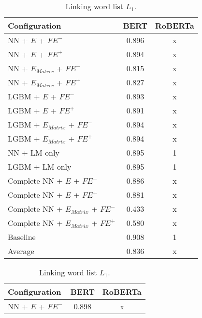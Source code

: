 \begin{table}[h]
  	\tiny
  	\centering
	\begin{subtable}{.5\textwidth}
		\centering
  		\renewcommand{\arraystretch}{1.4}
   		\begin{tabular}{|| l || c | c ||}
   			\hline
   			{Configuration} & {BERT} & {RoBERTa} \\
   			\hline\hline
   			NN + $E$ + $\textit{FE}^-$ &  0.896 & x \\
 			\hline
 			NN + $E$ + $\textit{FE}^+$ & 0.894 & x \\
 			\hline
 			NN + $E_{Matrix}$ + $\textit{FE}^-$ & 0.815 & x \\
 			\hline
 			NN + $E_{Matrix}$ + $\textit{FE}^+$ & 0.827 & x \\
 			\hline
 			LGBM + $E$ + $\textit{FE}^-$ & 0.893 & x \\
 			\hline
 			LGBM + $E$ + $\textit{FE}^+$ & 0.891 & x \\
 			\hline
 			LGBM + $E_{Matrix}$ + $\textit{FE}^-$ & 0.894 & x \\
 			\hline
 			LGBM + $E_{Matrix}$ + $\textit{FE}^+$ & 0.894 & x \\
 			\hline
 			NN + LM only & 0.895 & 1 \\
 			\hline
 			LGBM + LM only & 0.895 & 1 \\
 			\hline
 			Complete NN + $E$ + $\textit{FE}^-$ & 0.886 & x \\
 			\hline
 			Complete NN + $E$ + $\textit{FE}^+$ & 0.881 & x \\
 			\hline
 			Complete NN + $E_{Matrix}$ + $\textit{FE}^-$ & 0.433 & x \\
 			\hline
 			Complete NN + $E_{Matrix}$ + $\textit{FE}^+$ & 0.580 & x \\
 			\hline
 			Baseline & 0.908 & 1\\
 			\hline
 			\hline
 			Average & 0.836 & x \\
 			\hline
		\end{tabular}
		\renewcommand{\arraystretch}{1}
  		\caption{Linking word list $L_1$.}%
  	\end{subtable}%
  	\begin{subtable}{.5\textwidth}
		\centering
  		\renewcommand{\arraystretch}{1.4}
   		\begin{tabular}{|| l || c | c ||}
   			\hline
   			{Configuration} & {BERT} & {RoBERTa} \\
   			\hline\hline
   			NN + $E$ + $\textit{FE}^-$ &  0.898 & x \\

\end{tabular}
\end{subtable}
\end{table}
